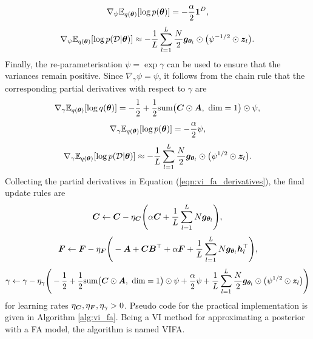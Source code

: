 \documentclass[10pt]{article} %
\begin{document}
\begin{equation}
\nabla_\psi \mathbb{E}_{q({\bm{\theta}})} [\log p({\bm{\theta}})] = -\frac{\alpha}{2} \bm{1}^D,
\end{equation}
\begin{equation}
\nabla_\psi \mathbb{E}_{q({\bm{\theta}})} [\log p(\mathcal{D} | {\bm{\theta}})] \approx  -\frac{1}{L} \sum_{l=1}^{L} \frac{N}{2} {\bm{g}}_{{\bm{\theta}}_l} \odot \big(\psi^{-1/2} \odot {\bm{z}}_l \big).
\end{equation}
Finally, the re-parameterisation $\psi = \exp \gamma$ can be used to ensure that the variances remain positive. Since $\nabla_\gamma \psi = \psi$, it follows from the chain rule that the corresponding partial derivatives with respect to $\gamma$ are 
\begin{equation}
	\nabla_\gamma \mathbb{E}_{q({\bm{\theta}})} [\log q({\bm{\theta}})] = -\frac{1}{2} + \frac{1}{2} \text{sum}\big({\bm{C}} \odot {\bm{A}}, \text{ dim} = 1\big) \odot \psi,
\end{equation}
\begin{equation}
	\nabla_\gamma \mathbb{E}_{q({\bm{\theta}})} [\log p({\bm{\theta}})] = -\frac{\alpha}{2} \psi,
\end{equation}
\begin{equation}
	\nabla_\gamma \mathbb{E}_{q({\bm{\theta}})} [\log p(\mathcal{D} | {\bm{\theta}})]
	 \approx  -\frac{1}{L} \sum_{l=1}^{L} \frac{N}{2} {\bm{g}}_{{\bm{\theta}}_l} \odot \big(\psi^{1/2} \odot {\bm{z}}_l \big).
\end{equation}
Collecting the partial derivatives in Equation (\ref{eqn:vi_fa_derivatives}), the final update rules are
 \begin{equation}\label{eqn:vifa_c_update}
	{\bm{C}} \leftarrow {\bm{C}} - \eta_{\bm{C}}\Bigg(
	\alpha {\bm{C}} + \frac{1}{L} \sum_{l=1}^{L} N {\bm{g}}_{{\bm{\theta}}_l}
	\Bigg),
\end{equation}
 \begin{equation}\label{eqn:vifa_F_update}
	{\bm{F}} \leftarrow {\bm{F}} - \eta_{\bm{F}}\Bigg(
	-{\bm{A}}  + {\bm{C}} {\bm{B}}^\top+ \alpha {\bm{F}} + \frac{1}{L} \sum_{l=1}^{L} N {\bm{g}}_{{\bm{\theta}}_l} {\bm{h}}_l^\top
	\Bigg),
\end{equation}
\begin{equation}\label{eqn:vifa_gamma_update}
	\gamma \leftarrow \gamma - \eta_\gamma\Bigg(
	-\frac{1}{2} + \frac{1}{2} \text{sum}\big({\bm{C}} \odot {\bm{A}}, \text{ dim} = 1\big) \odot \psi
	+\frac{\alpha}{2} \psi + \frac{1}{L} \sum_{l=1}^{L} \frac{N}{2} {\bm{g}}_{{\bm{\theta}}_l} \odot \big(\psi^{1/2} \odot {\bm{z}}_l \big)
	\Bigg)
\end{equation}
for learning rates $\eta_{\bm{C}},  \eta_{\bm{F}}, \eta_\gamma > 0$. Pseudo code for the practical implementation is given in Algorithm \ref{alg:vi_fa}. Being a VI method for approximating a posterior with a FA model, the algorithm is named VIFA.
\end{document}

